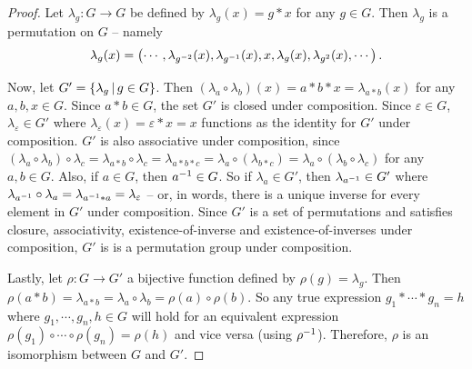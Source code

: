 \documentclass[a4paper,twoside,12pt,openany]{report}
\theoremstyle{plain}
\theoremstyle{definition}
\theoremstyle{remark}
\begin{document}
\begin{proof}
	Let \(\lambda_g:G\to G\) be defined by \(\lambda_g(x)=g*x\) for any \(g\in G\). Then \(\lambda_g\) is a permutation on \(G\) -- namely 
	\[
		\lambda_g(x)=\left(\cdots, \lambda_{g^{-2}}(x), \lambda_{g^{-1}}(x),x,\lambda_g(x), \lambda_{g^2}(x), \cdots\right)
	.\]

	Now, let \(G' = \left\{ \lambda_g \,\middle|\, g\in G \right\}\). Then \((\lambda_a\circ \lambda_b)(x)=a*b*x=\lambda_{a*b}(x)\) for any \(a,b,x\in G\). Since \(a*b \in G\), the set \(G'\) is closed under composition. Since \(\varepsilon \in G\), \(\lambda_\varepsilon \in G'\) where \(\lambda_\varepsilon(x)=\varepsilon*x = x\) functions as the identity for \(G'\) under composition. \(G'\) is also associative under composition, since \((\lambda_a\circ \lambda_b)\circ \lambda_c = \lambda_{a*b}\circ \lambda_c=\lambda_{a*b*c}=\lambda_a\circ(\lambda_{b*c})=\lambda_a\circ(\lambda_b\circ \lambda_c)\) for any \(a,b\in G\). Also, if \(a\in G\), then \(a^{-1}\in G\). So if \(\lambda_a\in G'\), then \(\lambda_{a^{-1}}\in G'\) where \(\lambda_{a^{-1}}\circ \lambda_{a}=\lambda_{a^{-1}*a}=\lambda_\varepsilon\) -- or, in words, there is a unique inverse for every element in \(G'\) under composition. Since \(G'\) is a set of permutations and satisfies closure, associativity, existence-of-inverse and existence-of-inverses under composition, \(G'\) is is a permutation group under composition.

	Lastly, let \(\rho:G\to G'\) a bijective function defined by \(\rho(g)=\lambda_g\). Then \(\rho(a*b)=\lambda_{a*b}=\lambda_a\circ\lambda_b=\rho(a)\circ\rho(b)\).
	So any true expression \(g_1*\cdots*g_n=h\) where \(g_1,\cdots, g_n,h\in G\) will hold for an equivalent expression \(\rho(g_1)\circ\cdots\circ\rho(g_n)=\rho(h)\) and vice versa (using \(\rho^{-1}\)).
	Therefore, \(\rho\) is an isomorphism between \(G\) and \(G'\).
\end{proof}
\end{document}
